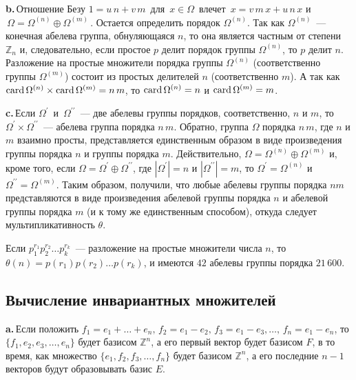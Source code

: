 \documentclass{../../template/mai_book}
\begin{document}
    {\bfseries b.\;}\,Отношение Безу $1 = u\,n + v\,m\,$ для $\,x \in \Omega\,$ влечет $\,x = v\,m\,x + u\,n\,x$ и $\,\Omega = \Omega^{(n)} \oplus \Omega^{(m)}\,$. Остается определить порядок $\Omega^{(n)}$. Так как $\Omega^{(n)}$~— конечная абелева группа, обнуляющаяся $n$, то она является
    частным от степени $\mathbb{Z}_n$ и, следовательно, если простое $p$ делит порядок группы $\Omega^{(n)}$, то $p$ делит $n$. Разложение на простые множители порядка группы $\Omega^{(n)}$ (соответственно группы $\Omega^{(m)}$) состоит из простых делителей $n$ (соответственно $m$). А так как $\operatorname{card} \Omega^{(n)} \times \operatorname{card} \Omega^{(m)} = n\,m$, то $\operatorname{card} \Omega^{(n)} = n$ и $\operatorname{card} \Omega^{(m)} = m$.

    {\bfseries c.\;}\,Если $\Omega^\prime\,$ и $\,\Omega^{\prime\prime}$~— две абелевы группы порядков, соответственно, $n$ и $m$, то $\Omega^\prime \times \Omega^{\prime\prime}$~— абелева группа порядка $n\,m$. Обратно, группа $\Omega$ порядка $n\,m$, где $n$ и $m$ взаимно просты, представляется единственным образом в виде произведения группы порядка $n$ и группы порядка $m$. Действительно, $\Omega = \Omega^{(n)} \oplus \Omega^{(m)}$ и, кроме того, если $\Omega = \Omega^\prime \oplus \Omega^{\prime\prime}$, где $|\Omega^\prime| = n$ и $|\Omega^{\prime\prime}| = m$, то $\Omega^\prime = \Omega^{(n)}$ и $\Omega^{\prime\prime} = \Omega^{(m)}$. Таким образом, получили, что любые абелевы группы порядка $nm$ представляются в виде произведения абелевой группы порядка $n$ и абелевой группы порядка $m$ (и к тому же единственным способом), откуда следует мультипликативность $\theta$.

    Если $p^{r_1}_1p^{r_2}_2 \ldots p^{r_k}_k$~— разложение на простые множители числа $n$, то \linebreak $\theta(n)=p(r_1)p(r_2) \ldots p(r_k)$, и имеются $42$ абелевы группы порядка $21\,600$.

    \subsection{\normalsize {Вычисление инвариантных множителей}}

    {\bfseries a.\;}\,Если положить $ f_1 = e_1 + \ldots + e_n,\,f_2 = e_1 - e_2,\,f_3 = e_1 - e_3, \ldots ,\,f_n = e_1 - e_n$, то $\{f_1, e_2, e_3, \ldots, e_n\}$ будет базисом $\mathbb{Z}^n$, а его первый вектор будет базисом $F$, в то время, как множество $\{e_1, f_2, f_3, \ldots, f_n\}$ будет базисом $\mathbb{Z}^n$, а его последние $n-1$ векторов будут образовывать базис $E$.
\end{document}

